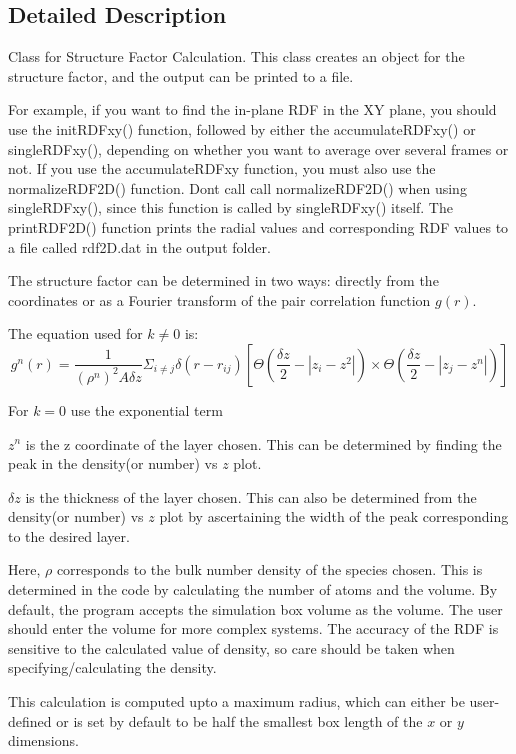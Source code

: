 \subsection{Detailed Description}
Class for Structure Factor Calculation. This class creates an object for the structure factor, and the output can be printed to a file. 

For example, if you want to find the in-\/plane R\+DF in the XY plane, you should use the init\+R\+D\+Fxy() function, followed by either the accumulate\+R\+D\+Fxy() or single\+R\+D\+Fxy(), depending on whether you want to average over several frames or not. If you use the accumulate\+R\+D\+Fxy function, you must also use the normalize\+R\+D\+F2\+D() function. Don\textquotesingle{}t call call normalize\+R\+D\+F2\+D() when using single\+R\+D\+Fxy(), since this function is called by single\+R\+D\+Fxy() itself. The print\+R\+D\+F2\+D() function prints the radial values and corresponding R\+DF values to a file called rdf2\+D.\+dat in the output folder.

The structure factor can be determined in two ways\+: directly from the coordinates or as a Fourier transform of the pair correlation function $g(r)$.

The equation used for $k \neq 0$ is\+: \[ g^n(r) = \frac{1}{(\rho^n)^2 A \delta z} \Sigma_{i \neq j} \delta(r - r_{ij}) \left[ \Theta\left( \frac{\delta z}{2}-|z_i-z^2| \right) \times \Theta\left( \frac{\delta z}{2}-|z_j-z^n| \right) \right] \]

For $k=0$ use the exponential term
\begin{DoxyItemize}
\item $z^n$ is the z coordinate of the layer chosen. This can be determined by finding the peak in the density(or number) vs $z$ plot.
\item $\delta z$ is the thickness of the layer chosen. This can also be determined from the density(or number) vs $z$ plot by ascertaining the width of the peak corresponding to the desired layer.
\item Here, $\rho$ corresponds to the bulk number density of the species chosen. This is determined in the code by calculating the number of atoms and the volume. By default, the program accepts the simulation box volume as the volume. The user should enter the volume for more complex systems. The accuracy of the R\+DF is sensitive to the calculated value of density, so care should be taken when specifying/calculating the density.
\item This calculation is computed upto a maximum radius, which can either be user-\/defined or is set by default to be half the smallest box length of the $x$ or $y$ dimensions. 
\end{DoxyItemize}


